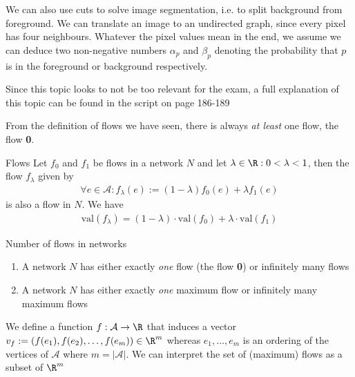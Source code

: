 
We can also use cuts to solve image segmentation, i.e. to split background from foreground. We can translate an image to an undirected graph, since every pixel has four neighbours.
Whatever the pixel values mean in the end, we assume we can deduce two non-negative numbers $\alpha_p$ and $\beta_p$ denoting the probability that $p$ is in the foreground or background respectively.

Since this topic looks to not be too relevant for the exam, a full explanation of this topic can be found in the script on page 186-189



From the definition of flows we have seen, there is always \textit{at least} one flow, the flow \textbf{0}.

\begin{lemma}[]{Flows}
    Let $f_0$ and $f_1$ be flows in a network $N$ and let $\lambda \in \R : 0 < \lambda < 1$, then the flow $f_{\lambda}$ given by
    \begin{align*}
        \forall e \in \mathcal{A} : f_{\lambda}(e) := (1 - \lambda)f_0(e) + \lambda f_1(e)
    \end{align*}
    is also a flow in $N$. We have
    \begin{align*}
        \text{val}(f_{\lambda}) = (1 - \lambda) \cdot \text{val}(f_0) + \lambda \cdot \text{val}(f_1)
    \end{align*}
\end{lemma}

\begin{corollary}[]{Number of flows in networks}
    \begin{enumerate}[label=(\roman*)]
        \item A network $N$ has either exactly \textit{one} flow (the flow \textbf{0}) or infinitely many flows
        \item A network $N$ has either exactly \textit{one} maximum flow or infinitely many maximum flows
    \end{enumerate}
\end{corollary}


We define a function $f: \mathcal{A} \rightarrow \R$ that induces a vector $v_f := (f(e_1), f(e_2), \ldots, f(e_m)) \in \R^m$ whereas $e_1, \ldots, e_m$ is an ordering of the vertices of $\mathcal{A}$ where $m = |\mathcal{A}|$.
We can interpret the set of (maximum) flows as a subset of $\R^m$


